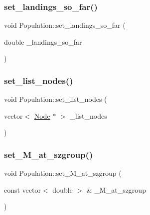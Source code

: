 \mbox{\label{class_population_ab72ccfca22cb62d0cc71771250b1f5f7}} 
\subsubsection{\texorpdfstring{set\_landings\_so\_far()}{set\_landings\_so\_far()}}
{\footnotesize\ttfamily void Population\+::set\+\_\+landings\+\_\+so\+\_\+far (\begin{DoxyParamCaption}\item[{double}]{\+\_\+landings\+\_\+so\+\_\+far }\end{DoxyParamCaption})}

\mbox{\label{class_population_afb8707dda108ce991159066714b4466c}} 
\subsubsection{\texorpdfstring{set\_list\_nodes()}{set\_list\_nodes()}}
{\footnotesize\ttfamily void Population\+::set\+\_\+list\+\_\+nodes (\begin{DoxyParamCaption}\item[{vector$<$ \mbox{\hyperlink{class_node}{Node}} $\ast$ $>$}]{\+\_\+list\+\_\+nodes }\end{DoxyParamCaption})}

\mbox{\label{class_population_a7006a7a5ffbe9b2d998fe5612b8aec1a}} 
\subsubsection{\texorpdfstring{set\_M\_at\_szgroup()}{set\_M\_at\_szgroup()}}
{\footnotesize\ttfamily void Population\+::set\+\_\+\+M\+\_\+at\+\_\+szgroup (\begin{DoxyParamCaption}\item[{const vector$<$ double $>$ \&}]{\+\_\+\+M\+\_\+at\+\_\+szgroup }\end{DoxyParamCaption})}

